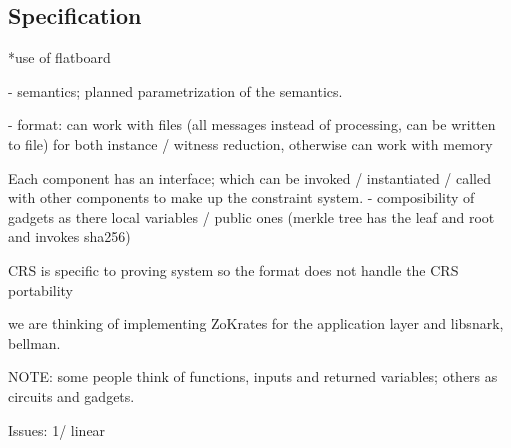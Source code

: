 \documentclass[a4paper,11pt]{article}
\begin{document}
	
	
	\subsection{Specification}
	
	*use of flatboard
	
	- semantics; planned parametrization of the semantics.
	
	- format: can work with files (all messages instead of processing, can be written to file) for both instance / witness reduction, otherwise can work with memory 
	
	Each component has an interface; which can be invoked / instantiated / called with other components to make up the constraint system.
		- composibility of gadgets as there local variables / public ones (merkle tree has the leaf and root and invokes sha256)
	
	CRS is specific to proving system so the format does not handle the CRS portability
	
	we are thinking of implementing ZoKrates for the application layer and libsnark, bellman.  
	
	NOTE: some people think of functions, inputs and returned variables; others as circuits and gadgets.
	
	
	Issues: 1/ linear 
\end{document}
